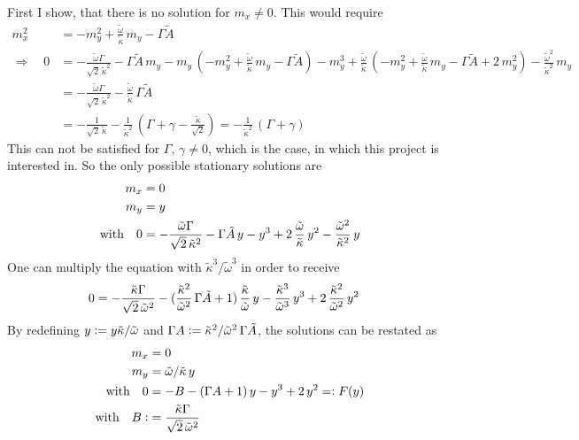 \documentclass{article}
\begin{document}
First I show, that there is no solution for $m_x\neq0$. This would require
\begin{align*}
    m_x^2&=-m_y^2+\frac{\tilde{\omega}}{\tilde{\kappa}}\,m_y-\Gamma\tilde{A} \\
    \Rightarrow\quad0&=-\frac{\tilde{\omega}\Gamma}{\sqrt{2}\,\tilde{\kappa}^2}-\Gamma\tilde{A}\,m_y    -m_y\,(-m_y^2+\frac{\tilde{\omega}}{\tilde{\kappa}}\,m_y-\Gamma\tilde{A})- m_y^3+\frac{\tilde{\omega}}{\tilde{\kappa}}\,(-m_y^2+\frac{\tilde{\omega}}{\tilde{\kappa}}\,m_y-\Gamma\tilde{A}+2\,m_y^2)-\frac{\tilde{\omega}^2}{\tilde{\kappa}^2}\,m_y  \\
    &=-\frac{\tilde{\omega}\Gamma}{\sqrt{2}\,\tilde{\kappa}^2}-\frac{\tilde{\omega}}{\tilde{\kappa}}\,\Gamma\tilde{A}\\
    &=-\frac{1}{\sqrt{2}\,\tilde{\kappa}}-\frac{1}{\tilde{\kappa}^2}\,(\Gamma+\gamma-\frac{\tilde{\kappa}}{\sqrt{2}})=-\frac{1}{\tilde{\kappa}^2}\,(\Gamma+\gamma)
\end{align*} 
This can not be satisfied for $\Gamma,\,\gamma\neq0$, which is the case, in which this project is interested in. So the only possible stationary solutions are
\begin{align*}
    m_x&=0\\
    m_y&={y}\\
    \text{with}\quad0&=-\frac{\tilde{\omega}\Gamma}{\sqrt{2}\,\tilde{\kappa}^2}-\Gamma\tilde{A}\,{y}    - {y}^3+2\,\frac{\tilde{\omega}}{\tilde{\kappa}}\,{y}^2-\frac{\tilde{\omega}^2}{\tilde{\kappa}^2}\,{y}  
\end{align*}
One can multiply the equation with $\tilde{\kappa}^3/\tilde{\omega}^3$ in order to receive
\begin{align*}
    0&=-\frac{\tilde{\kappa}\Gamma}{\sqrt{2}\,\tilde{\omega}^2}-(\frac{\tilde{\kappa}^2}{\tilde{\omega}^2}\,\Gamma\tilde{A}+1)\,\frac{\tilde{\kappa}}{\tilde{\omega}}\,{y}    - \frac{\tilde{\kappa}^3}{\tilde{\omega}^3}\,{y}^3+2\,\frac{\tilde{\kappa}^2}{\tilde{\omega}^2}\,{y}^2 
\end{align*}
By redefining ${y}\vcentcolon=y\tilde{\kappa}/\tilde{\omega}$ and $\Gamma A\vcentcolon=\tilde{\kappa}^2/\tilde{\omega}^2\,\Gamma\tilde{A}$, the solutions can be restated as
\begin{align*}
    m_x&=0\\
    m_y&=\tilde{\omega}/\tilde{\kappa}\,{y}\\
    \text{with}\quad0&=-B-(\Gamma A+1)\,{y}    - {y}^3+2\,{y}^2=\vcentcolon F({y})\\
    \text{with}\quad B\vcentcolon&= \frac{\tilde{\kappa}\Gamma}{\sqrt{2}\,\tilde{\omega}^2}
\end{align*}
\end{document}
